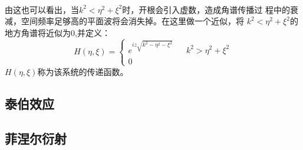 \documentclass{article}
\begin{document}
\paragraph{}
由这也可以看出，当$k^2<\eta^2+\xi^2$时，开根会引入虚数，造成角谱传播过
程中的衰减，空间频率足够高的平面波将会消失掉。在这里做一个近似，将
$k^2<\eta^2+\xi^2$的地方角谱将近似为0,并定义：
\begin{equation}
  \label{eq:4}
  H(\eta,\xi)=\left \{
    \begin{array}{rcl}
      e^{iz \sqrt{k^2-\eta^2-\xi^2}}&&{k^2>\eta^2+\xi^2}\\
      0&&{}
    \end{array}
  \right
  .
\end{equation}
$H(\eta,\xi)$称为该系统的传递函数。

\subsection{泰伯效应}
\subsection{菲涅尔衍射}
\end{document}
